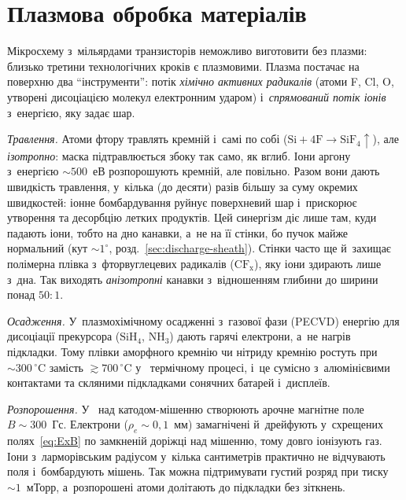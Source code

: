\section{Плазмова обробка матеріалів}\label{sec:plasma-processing}

Мікросхему з~мільярдами транзисторів неможливо виготовити без плазми: близько третини
технологічних кроків є плазмовими. Плазма постачає на поверхню два \enquote{інструменти}:
потік \emph{хімічно активних радикалів} (атоми F, Cl, O, утворені дисоціацією молекул електронним
ударом) і~\emph{спрямований потік іонів} з~енергією, яку задає шар.

\emph{Травлення.} Атоми фтору травлять кремній і~самі по собі ($\mathrm{Si}+4\mathrm F\to\mathrm{SiF_4}\uparrow$),
але \emph{ізотропно}: маска підтравлюється збоку так само, як вглиб. Іони аргону з~енергією
$\sim500$~еВ розпорошують кремній, але повільно. Разом вони дають швидкість травлення, у~кілька
(до десяти) разів більшу за суму окремих швидкостей: іонне бомбардування руйнує поверхневий шар і~прискорює
утворення та десорбцію летких продуктів. Цей  синергізм діє лише там, куди падають
іони, тобто на дно канавки, а~не на її стінки, бо пучок майже нормальний (кут $\sim1^\circ$, розд.~\ref{sec:discharge-sheath}).
Стінки часто ще й~захищає полімерна плівка з~фторвуглецевих радикалів ($\mathrm{CF_x}$), яку
іони здирають лише з~дна. Так виходять \emph{анізотропні} канавки з~відношенням глибини до ширини
понад $50{:}1$.

\emph{Осадження.} У~плазмохімічному осадженні з~газової фази (PECVD) енергію для дисоціації
прекурсора ($\mathrm{SiH_4}$, $\mathrm{NH_3}$) дають гарячі електрони, а~не нагрів підкладки. Тому
плівки аморфного кремнію чи нітриду кремнію ростуть при $\sim300\,^\circ\mathrm{C}$ замість $\gtrsim700\,^\circ\mathrm{C}$ у~
термічному процесі, і~це сумісно з~алюмінієвими контактами та скляними підкладками сонячних батарей
і~дисплеїв.

\emph{Розпорошення.} У~ над катодом-мішенню створюють арочне магнітне поле
$B\sim300$~Гс. Електрони ($\rho_e\sim0{,}1$~мм) замагнічені й~дрейфують у~схрещених полях~\eqref{eq:ExB}
по замкненій доріжці над мішенню, тому довго іонізують газ. Іони з~ларморівським радіусом
у~кілька сантиметрів практично не відчувають поля і~бомбардують мішень. Так можна підтримувати
густий розряд при тиску $\sim1$~мТорр, а~розпорошені атоми долітають до підкладки без зіткнень.

